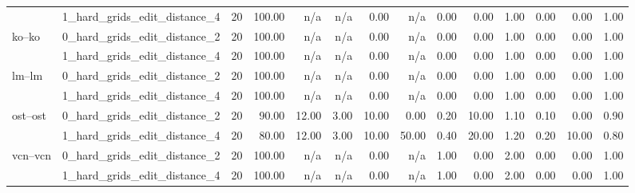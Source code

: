\begin{tabular}{llrrrrrrrrrrrr}
 & 1_hard_grids_edit_distance_4 & 20 & 100.00 & n/a & n/a & 0.00 & n/a & 0.00 & 0.00 & 1.00 & 0.00 & 0.00 & 1.00 \\
\cline{1-14}
\multirow[t]{2}{*}{ko--ko} & 0_hard_grids_edit_distance_2 & 20 & 100.00 & n/a & n/a & 0.00 & n/a & 0.00 & 0.00 & 1.00 & 0.00 & 0.00 & 1.00 \\
 & 1_hard_grids_edit_distance_4 & 20 & 100.00 & n/a & n/a & 0.00 & n/a & 0.00 & 0.00 & 1.00 & 0.00 & 0.00 & 1.00 \\
\cline{1-14}
\multirow[t]{2}{*}{lm--lm} & 0_hard_grids_edit_distance_2 & 20 & 100.00 & n/a & n/a & 0.00 & n/a & 0.00 & 0.00 & 1.00 & 0.00 & 0.00 & 1.00 \\
 & 1_hard_grids_edit_distance_4 & 20 & 100.00 & n/a & n/a & 0.00 & n/a & 0.00 & 0.00 & 1.00 & 0.00 & 0.00 & 1.00 \\
\cline{1-14}
\multirow[t]{2}{*}{ost--ost} & 0_hard_grids_edit_distance_2 & 20 & 90.00 & 12.00 & 3.00 & 10.00 & 0.00 & 0.20 & 10.00 & 1.10 & 0.10 & 0.00 & 0.90 \\
 & 1_hard_grids_edit_distance_4 & 20 & 80.00 & 12.00 & 3.00 & 10.00 & 50.00 & 0.40 & 20.00 & 1.20 & 0.20 & 10.00 & 0.80 \\
\cline{1-14}
\multirow[t]{2}{*}{vcn--vcn} & 0_hard_grids_edit_distance_2 & 20 & 100.00 & n/a & n/a & 0.00 & n/a & 1.00 & 0.00 & 2.00 & 0.00 & 0.00 & 1.00 \\
 & 1_hard_grids_edit_distance_4 & 20 & 100.00 & n/a & n/a & 0.00 & n/a & 1.00 & 0.00 & 2.00 & 0.00 & 0.00 & 1.00 \\
\cline{1-14}
\bottomrule
\end{tabular}
